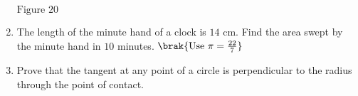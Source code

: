 \begin{enumerate}
\begin{figure}[ht]
\end{figure}
\begin{center}
$\text{Figure } 20$
\end{center}
\item The length of the minute hand of a clock is $14\text{ cm}$. Find the area swept by the minute hand in $10$ minutes. $\brak{\text{Use } \pi = \frac{22}{7}}$ 
\item Prove that the tangent at any point of a circle is perpendicular to the radius through the point of contact. 
\end{enumerate}
